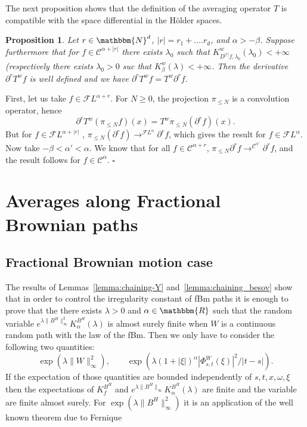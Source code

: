 \documentclass[a4paper,11pt]{article}
\newtheorem{proposition}[theorem]{Proposition}
\newenvironment{proof}{{\sc Proof.}}{\hfill$\square$}
\newcommand{\CC}{\mathscr C}
\newcommand{\CF}{\mathscr F}
\begin{document}
The next proposition shows that the definition of the averaging operator $T$
is compatible with the space differential in the H\"older spaces.

\begin{proposition}
  \label{prop:diffenrentiability_averaging_path}Let $r \in \mathbbm{N}^{d}$,
  $| r | =r_{1} + \ldots .r_{d}$, and $\alpha >- \beta$. Suppose furthermore
  that for $f \in \CC^{\alpha + | r |}$ there exists $\lambda_{0}$ such that
  $K^{w}_{D^{| r |} f, \lambda_{0}} ( \lambda_{0} ) <+ \infty$ (respectively
  there exists $\lambda_{0} >0$ suc that $K^{w}_{\beta} ( \lambda ) <+
  \infty$. Then the derivative $\partial^{r} T^{w} f$ is well defined and we
  have $\partial^{r} T^{w} f=T^{w} \partial^{r} f$.
\end{proposition}

\begin{proof}
  First, let us take $f \in \CF L^{\alpha +r}$. For $N \geqslant 0$, the
  projection $\pi_{\leqslant N}$ is a convolution operator, hence
  \[ \partial^{r} T^{w} ( \pi_{\leqslant N} f ) ( x ) =T^{w} \pi_{\leqslant N}
     ( \partial^{r} f ) ( x ) . \]
  But for $f \in \CF L^{\alpha + | r |}$ , $\pi_{\leqslant N} ( \partial^{r} f
  ) \rightarrow^{\CF L^{\alpha}} \partial^{r} f$, which gives the result for
  $f \in \CF L^{\alpha}$. Now take $- \beta < \alpha' < \alpha$. We know that
  for all $f \in \CC^{\alpha +r}$, $\pi_{\leqslant N} \partial^{r} f
  \rightarrow^{\CC^{\alpha'}} \partial^{r} f$, and the result follows for $f
  \in \CC^{\alpha}$.
\end{proof}

\section{Averages along Fractional Brownian paths}

\subsection{Fractional Brownian motion case}

The results of Lemmas~\ref{lemma:chaining-Y} and~\ref{lemma:chaining_besov}
show that in order to control the irregularity constant of fBm paths it is
enough to prove that the there exists $\lambda >0$ and $\alpha \in
\mathbbm{R}$ such that the random variable $e^{\lambda \| B^{H}
\|_{\infty}^{2}} K^{B^{H}}_{\alpha} ( \lambda )$ is almost surely finite when
$W$ is a continuous random path with the law of the fBm. Then we only have to
consider the following two quantities:
\[ \exp ( \lambda \| W \|_{\infty}^{2} ), \qquad
 \exp ( \lambda ( 1+ | \xi | )^{\alpha} | \Phi_{s,t}^{W} ( \xi ) |^{2} / |
   t-s | ) . \]
If the expectation of those quantities are bounded independently of $s,t,x,
\omega , \xi$ then the expectations of $K^{B^{H}}_{f}$ and $e^{\lambda \|
B^{H} \|_{\infty}} K^{B^{H}}_{\alpha} ( \lambda )$ are finite and the variable
are finite almost surely. For $\exp ( \lambda \| B^{H} \|_{\infty}^{2} )$ it
is an application of the well known theorem due to Fernique
\end{document}
